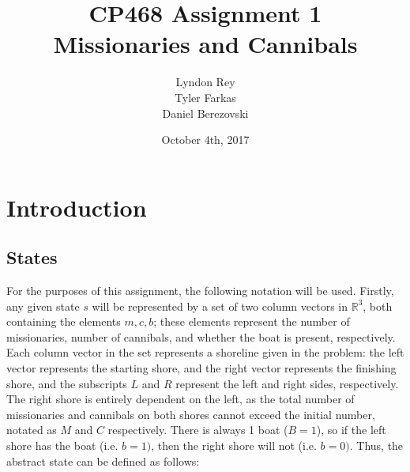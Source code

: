 \documentclass[11pt]{article}
\title{\textbf{CP468 Assignment 1\\Missionaries and Cannibals}}
\author{Lyndon Rey\\
		Tyler Farkas\\
		Daniel Berezovski}
\date{October 4th, 2017}
\begin{document}
\maketitle

\section{Introduction}
\subsection{States}
For the purposes of this assignment, the following notation will be used. Firstly, any given state \(s\) will be represented by a set of two column vectors in \(\mathbb{R}^3\), both containing the elements \(m, c, b\); these elements represent the number of missionaries, number of cannibals, and whether the boat is present, respectively. Each column vector in the set represents a shoreline given in the problem: the left vector represents the starting shore, and the right vector represents the finishing shore, and the subscripts \(L\) and \(R\) represent the left and right sides, respectively. The right shore is entirely dependent on the left, as the total number of missionaries and cannibals on both shores cannot exceed the initial number, notated as \(M\) and \(C\) respectively. There is always 1 boat (\(B=1\)), so if the left shore has the boat (i.e. \(b=1)\), then the right shore will not (i.e. \(b=0)\). Thus, the abstract state can be defined as follows:
 
\end{document}
